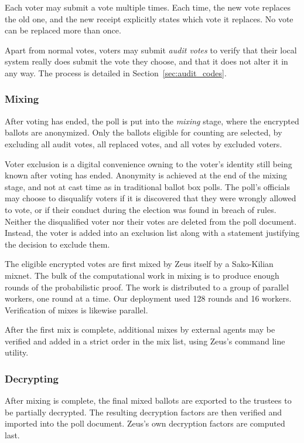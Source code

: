 \documentclass[letterpaper,10pt]{article}
\begin{document}
Each voter may submit a vote multiple times.
Each time, the new vote replaces the old one,
and the new receipt explicitly states which vote it replaces.
No vote can be replaced more than once.

Apart from normal votes, voters may submit \emph{audit votes} to verify
that their local system really does submit the vote they choose,
and that it does not alter it in any way.
The process is detailed in Section~\ref{sec:audit_codes}.

\subsubsection{Mixing}
\label{sec:mixing}
After voting has ended, the poll is put into the \emph{mixing} stage,
where the encrypted ballots are anonymized.
Only the ballots eligible for counting are selected, by excluding
all audit votes, all replaced votes, and all votes by excluded voters.

Voter exclusion is a digital convenience owning to
the voter's identity still being known after voting has ended.
Anonymity is achieved at the end of the mixing stage,
and not at cast time as in traditional ballot box polls.
The poll's officials may choose to disqualify voters if
it is discovered that they were wrongly allowed to vote, or if
their conduct during the election was found in breach of rules.
Neither the disqualified voter nor their votes are deleted from 
the poll document. Instead, the voter is added into an exclusion 
list along with a statement justifying the decision to exclude them.

The eligible encrypted votes are first mixed by Zeus itself
by a Sako-Kilian mixnet.
The bulk of the computational work in mixing is to produce
enough rounds of the probabilistic proof.
The work is distributed to a group of parallel workers,
one round at a time. Our deployment used 128 rounds and 16 workers.
Verification of mixes is likewise parallel.

After the first mix is complete, additional mixes by external agents
may be verified and added in a strict order in the mix list, using
Zeus's command line utility.

\subsubsection{Decrypting}
\label{sec:decrypting}

After mixing is complete, the final mixed ballots are exported to
the trustees to be partially decrypted.
The resulting decryption factors are then verified and imported
into the poll document.
Zeus's own decryption factors are computed last.
\end{document}
